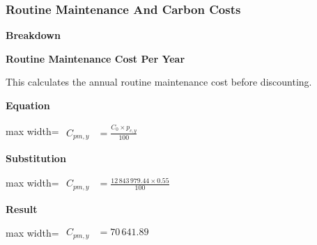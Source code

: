\documentclass{article}
\begin{document}
\subsubsection{Routine Maintenance And Carbon Costs}
\vspace{0.4em}
\textbf{Breakdown}\par\vspace{-0.35em}
\vspace{0.4em}
\textbf{Routine Maintenance Cost Per Year}\par\vspace{-0.35em}
This calculates the annual routine maintenance cost before discounting.

\vspace{0.4em}
\textbf{Equation}\par\vspace{-0.35em}
\begin{center}
\begin{adjustbox}{max width=\linewidth}
$\displaystyle\begin{aligned}
C_{pm,y} &= \frac{C_0 \times p_{c,y}}{100}
\end{aligned}$
\end{adjustbox}
\end{center}
\vspace{0.4em}
\textbf{Substitution}\par\vspace{-0.35em}
\begin{center}
\begin{adjustbox}{max width=\linewidth}
$\displaystyle\begin{aligned}
C_{pm,y} &= \frac{12\,843\,979.44 \times 0.55}{100}
\end{aligned}$
\end{adjustbox}
\end{center}
\vspace{0.4em}
\textbf{Result}\par\vspace{-0.35em}
\begin{center}
\begin{adjustbox}{max width=\linewidth}
$\displaystyle\begin{aligned}
C_{pm,y} &= 70\,641.89
\end{aligned}$
\end{adjustbox}
\end{center}
\end{document}
